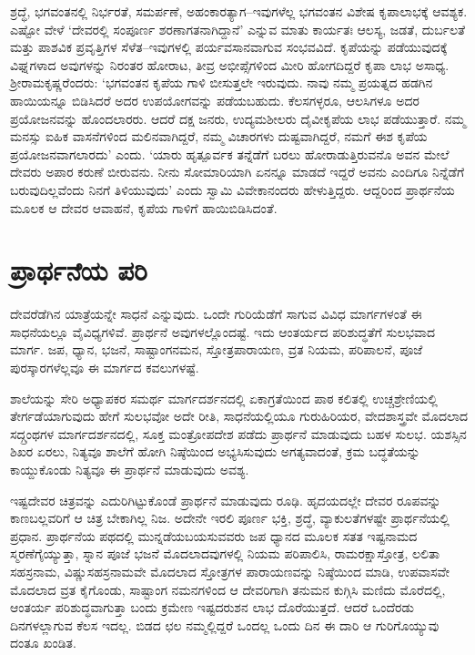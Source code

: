 ಶ್ರದ್ಧೆ, ಭಗವಂತನಲ್ಲಿ ನಿರ್ಭರತೆ, ಸಮರ್ಪಣೆ, ಅಹಂಕಾರತ್ಯಾಗ–ಇವುಗಳೆಲ್ಲ ಭಗವಂತನ ವಿಶೇಷ ಕೃಪಾಲಾಭಕ್ಕೆ ಆವಶ್ಯಕ. ಎಷ್ಟೋ ವೇಳೆ ‘ದೇವರಲ್ಲಿ ಸಂಪೂರ್ಣ ಶರಣಾಗತನಾಗಿದ್ದಾನೆ’ ಎನ್ನುವ ಮಾತು ಕಾರ್ಯತಃ ಆಲಸ್ಯ, ಜಡತೆ, ದುರ್ಬಲತೆ ಮತ್ತು ಪಾಶವಿಕ ಪ್ರವೃತ್ತಿಗಳ ಸೆಳೆತ–ಇವುಗಳಲ್ಲಿ ಪರ್ಯವಸಾನವಾಗುವ ಸಂಭವವಿದೆ. ಕೃಪೆಯನ್ನು ಪಡೆಯುವುದಕ್ಕೆ ವಿಘ್ನಗಳಾದ ಅವುಗಳನ್ನು ನಿರಂತರ ಹೋರಾಟ, ತೀವ್ರ ಅಭೀಪ್ಸೆಗಳಿಂದ ಮೀರಿ ಹೋಗದಿದ್ದರೆ ಕೃಪಾ ಲಾಭ ಅಸಾಧ್ಯ. ಶ‍್ರೀರಾಮಕೃಷ್ಣರೆಂದರು: ‘ಭಗವಂತನ ಕೃಪೆಯ ಗಾಳಿ ಬೀಸುತ್ತಲೇ ಇರುವುದು. ನಾವು ನಮ್ಮ ಪ್ರಯತ್ನದ ಹಡಗಿನ ಹಾಯಿಯನ್ನೂ ಬಿಡಿಸಿದರೆ ಅದರ ಉಪಯೋಗವನ್ನು ಪಡೆಯಬಹುದು. ಕೆಲಸಗಳ್ಳರೂ, ಆಲಸಿಗಳೂ ಅದರ ಪ್ರಯೋಜನವನ್ನು ಹೊಂದಲಾರರು. ಆದರೆ ದಕ್ಷ ಜನರು, ಉದ್ಯಮಶೀಲರು ದೈವೀಕೃಪೆಯ ಲಾಭ ಪಡೆಯುತ್ತಾರೆ. ನಮ್ಮ ಮನಸ್ಸು ಐಹಿಕ ವಾಸನೆಗಳಿಂದ ಮಲಿನವಾಗಿದ್ದರೆ, ನಮ್ಮ ವಿಚಾರಗಳು ದುಷ್ಟವಾಗಿದ್ದರೆ, ನಮಗೆ ಈಶ ಕೃಪೆಯ ಪ್ರಯೋಜನವಾಗಲಾರದು’ ಎಂದು. ‘ಯಾರು ಹೃತ್ಪೂರ್ವಕ ತನ್ನೆಡೆಗೆ ಬರಲು ಹೋರಾಡುತ್ತಿರುವನೊ ಅವನ ಮೇಲೆ ದೇವರು ಅಪಾರ ಕರುಣೆ ಬೀರುವನು. ನೀನು ಸೋಮಾರಿಯಾಗಿ ಏನನ್ನೂ ಮಾಡದೆ ಇದ್ದರೆ ಅವನು ಎಂದಿಗೂ ನಿನ್ನೆಡೆಗೆ ಬರುವುದಿಲ್ಲವೆಂದು ನಿನಗೆ ತಿಳಿಯುವುದು’ ಎಂದು ಸ್ವಾಮಿ ವಿವೇಕಾನಂದರು ಹೇಳುತ್ತಿದ್ದರು. ಆದ್ದರಿಂದ ಪ್ರಾರ್ಥನೆಯ ಮೂಲಕ ಆ ದೇವರ ಆವಾಹನೆ, ಕೃಪೆಯ ಗಾಳಿಗೆ ಹಾಯಿಬಿಡಿಸಿದಂತೆ.


\section{ಪ್ರಾರ್ಥನೆಯ ಪರಿ}

ದೇವರೆಡೆಗಿನ ಯಾತ್ರೆಯನ್ನೇ ಸಾಧನೆ ಎನ್ನುವುದು. ಒಂದೇ ಗುರಿಯೆಡೆಗೆ ಸಾಗುವ ವಿವಿಧ ಮಾರ್ಗಗಳಂತೆ ಈ ಸಾಧನೆಯಲ್ಲೂ ವೈವಿಧ್ಯಗಳಿವೆ. ಪ್ರಾರ್ಥನೆ ಅವುಗಳಲ್ಲೊಂದಷ್ಟೆ. ಇದು ಆಂತರ್ಯದ ಪರಿಶುದ್ಧತೆಗೆ ಸುಲಭವಾದ ಮಾರ್ಗ. ಜಪ, ಧ್ಯಾನ, ಭಜನೆ, ಸಾಷ್ಟಾಂಗನಮನ, ಸ್ತೋತ್ರಪಾರಾಯಣ, ವ್ರತ ನಿಯಮ, ಪರಿಪಾಲನೆ, ಪೂಜೆ ಪುರಸ್ಕಾರಗಳೆಲ್ಲವೂ ಈ ಮಾರ್ಗದ ಕವಲುಗಳಷ್ಟೆ.

ಶಾಲೆಯನ್ನು ಸೇರಿ ಅಧ್ಯಾಪಕರ ಸಮರ್ಥ ಮಾರ್ಗದರ್ಶನದಲ್ಲಿ ಏಕಾಗ್ರತೆಯಿಂದ ಪಾಠ ಕಲಿತಲ್ಲಿ ಉಚ್ಚಶ್ರೇಣಿಯಲ್ಲಿ ತೇರ್ಗಡೆಯಾಗುವುದು ಹೇಗೆ ಸುಲಭವೋ ಅದೇ ರೀತಿ, ಸಾಧನೆಯಲ್ಲಿಯೂ ಗುರುಹಿರಿಯರ, ವೇದಶಾಸ್ತ್ರವೇ ಮೊದಲಾದ ಸದ್ಗ್ರಂಥಗಳ ಮಾರ್ಗದರ್ಶನದಲ್ಲಿ, ಸೂಕ್ತ ಮಂತ್ರೋಪದೇಶ ಪಡೆದು ಪ್ರಾರ್ಥನೆ ಮಾಡುವುದು ಬಹಳ ಸುಲಭ. ಯಶಸ್ಸಿನ ಶಿಖರ ಏರಲು, ನಿತ್ಯವೂ ಶಾಲೆಗೆ ಹೋಗಿ ನಿಷ್ಠೆಯಿಂದ ಅಭ್ಯಸಿಸುವುದು ಅಗತ್ಯವಾದಂತೆ, ಕ್ರಮ ಬದ್ಧತೆಯನ್ನು ಕಾಯ್ದುಕೊಂಡು ನಿತ್ಯವೂ ಈ ಪ್ರಾರ್ಥನೆ ಮಾಡುವುದು ಅವಶ್ಯ.

ಇಷ್ಟದೇವರ ಚಿತ್ರವನ್ನು ಎದುರಿಗಿಟ್ಟುಕೊಂಡೆ ಪ್ರಾರ್ಥನೆ ಮಾಡುವುದು ರೂಢಿ. ಹೃದಯದಲ್ಲೇ ದೇವರ ರೂಪವನ್ನು ಕಾಣಬಲ್ಲವರಿಗೆ ಆ ಚಿತ್ರ ಬೇಕಾಗಿಲ್ಲ ನಿಜ. ಅದೇನೇ ಇರಲಿ ಪೂರ್ಣ ಭಕ್ತಿ, ಶ್ರದ್ಧೆ, ವ್ಯಾಕುಲತೆಗಳಷ್ಟೇ ಪ್ರಾರ್ಥನೆಯಲ್ಲಿ ಪ್ರಧಾನ. ಪ್ರಾರ್ಥನೆಯ ಪಥದಲ್ಲಿ ಮುನ್ನಡೆಯಬಯಸುವವರು ಜಪ ಧ್ಯಾನದ ಮೂಲಕ ಸತತ ಇಷ್ಟನಾಮದ ಸ್ಮರಣೆಗೈಯ್ಯುತ್ತಾ, ಸ್ನಾನ ಪೂಜೆ ಭಜನೆ ಮೊದಲಾದವುಗಳಲ್ಲಿ ನಿಯಮ ಪರಿಪಾಲಿಸಿ, ರಾಮರಕ್ಷಾಸ್ತೋತ್ರ, ಲಲಿತಾ ಸಹಸ್ರನಾಮ, ವಿಷ್ಣುಸಹಸ್ರನಾಮವೇ ಮೊದಲಾದ ಸ್ತೋತ್ರಗಳ ಪಾರಾಯಣವನ್ನು ನಿಷ್ಠೆಯಿಂದ ಮಾಡಿ, ಉಪವಾಸವೇ ಮೊದಲಾದ ವ್ರತ ಕೈಗೊಂಡು, ಸಾಷ್ಟಾಂಗ ನಮನಗಳಿಂದ ಆ ದೇವರಿಗಾಗಿ ತನುಮನ ಕುಗ್ಗಿಸಿ ಮಣಿದು ಮೊರೆದಲ್ಲಿ, ಆಂತರ್ಯ ಪರಿಶುದ್ಧವಾಗುತ್ತಾ ಬಂದು ಕ್ರಮೇಣ ಇಷ್ಟದರುಶನ ಲಾಭ ದೊರೆಯುತ್ತದೆ. ಆದರೆ ಒಂದೆರಡು ದಿನಗಳಲ್ಲಾಗುವ ಕೆಲಸ ಇದಲ್ಲ. ಬಿಡದ ಛಲ ನಮ್ಮಲ್ಲಿದ್ದರೆ ಒಂದಲ್ಲ ಒಂದು ದಿನ ಈ ದಾರಿ ಆ ಗುರಿಗೊಯ್ಯುವು ದಂತೂ ಖಂಡಿತ.


